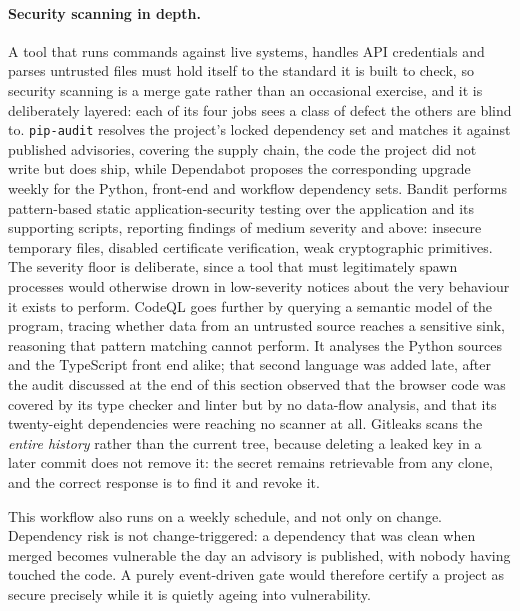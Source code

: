 \paragraph{Security scanning in depth.} A tool that runs commands against live
systems, handles API credentials and parses untrusted files must hold itself to the
standard it is built to check, so security scanning is a merge gate rather than an
occasional exercise, and it is deliberately layered: each of its four jobs sees a
class of defect the others are blind to. \texttt{pip-audit} resolves the project's
locked dependency set and matches it against published advisories, covering the
supply chain, the code the project did not write but does ship, while
Dependabot proposes the corresponding upgrade weekly for the Python, front-end and
workflow dependency sets. Bandit performs pattern-based
static application-security testing over the application and its supporting
scripts, reporting findings of medium
severity and above: insecure temporary files, disabled certificate verification, weak
cryptographic primitives. The severity floor is deliberate, since a tool that must
legitimately spawn processes would otherwise drown in low-severity notices about the
very behaviour it exists to perform. CodeQL goes further by querying a
semantic model of the program, tracing whether data from an untrusted source reaches a
sensitive sink, reasoning that pattern matching cannot perform. It analyses the
Python sources and the TypeScript front end alike; that second language was added
late, after the audit discussed at the end of this section observed that the browser
code was covered by its type checker and linter but by no data-flow analysis, and
that its twenty-eight dependencies were reaching no scanner at all. Gitleaks scans
the \emph{entire history} rather than the current tree, because
deleting a leaked key in a later commit does not remove it: the secret remains
retrievable from any clone, and the correct response is to find it and revoke it.

This workflow also runs on a weekly schedule, and not only on change. Dependency risk
is not change-triggered: a dependency that was clean when merged becomes vulnerable
the day an advisory is published, with nobody having touched the code. A purely
event-driven gate would therefore certify a project as secure precisely while it is
quietly ageing into vulnerability.

